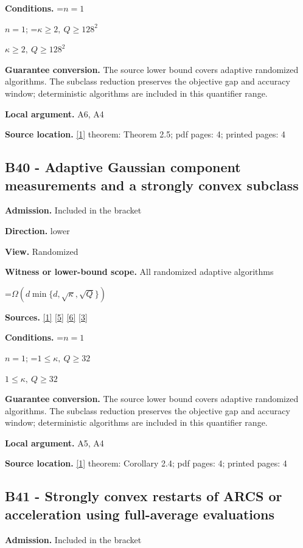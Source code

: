 \documentclass[10pt,a4paper]{article}
\newcommand{\AtlasMath}[1]{\par\begingroup\centering\setbox0=\hbox{$\displaystyle #1$}\ifdim\wd0>1.4\linewidth\typeout{ATLAS WIDE FORMULA: \the\wd0}\fi\ifdim\wd0>\linewidth\resizebox{\linewidth}{!}{\box0}\else\box0\fi\par\endgroup}
\newcommand{\AtlasInlineMath}[1]{\begingroup\setbox0=\hbox{$#1$}\ifdim\wd0>.4\linewidth\endgroup\AtlasMath{#1}\else\endgroup$#1$\fi}
\begin{document}
\textbf{Conditions.} \AtlasInlineMath{n=1}; \AtlasInlineMath{\kappa\ge2,\ Q\ge128^2}

\textbf{Guarantee conversion.} The source lower bound covers adaptive randomized algorithms. The subclass reduction preserves the objective gap and accuracy window; deterministic algorithms are included in this quantifier range.

\textbf{Local argument.} A6, A4

\textbf{Source location.} \href{https://arxiv.org/html/2610.00345v1}{[1]} theorem: Theorem 2.5; pdf pages: 4; printed pages: 4

\subsection{B40 - Adaptive Gaussian component measurements and a strongly convex subclass}
\textbf{Admission.} Included in the bracket

\textbf{Direction.} lower

\textbf{View.} Randomized

\textbf{Witness or lower-bound scope.} All randomized adaptive algorithms

\AtlasMath{\Omega(d\min\{d,\sqrt\kappa,\sqrt Q\})}
\textbf{Sources.} \href{https://arxiv.org/html/2610.00345v1}{[1]} \href{https://arxiv.org/html/2607.16558v2}{[5]} \href{https://www.mathnet.ru/php/archive.phtml?jrnid=mzm&option_lang=eng&paperid=1697&wshow=paper}{[6]} \href{https://arxiv.org/abs/2109.08858}{[3]}

\textbf{Conditions.} \AtlasInlineMath{n=1}; \AtlasInlineMath{1\le\kappa,\ Q\ge32}

\textbf{Guarantee conversion.} The source lower bound covers adaptive randomized algorithms. The subclass reduction preserves the objective gap and accuracy window; deterministic algorithms are included in this quantifier range.

\textbf{Local argument.} A5, A4

\textbf{Source location.} \href{https://arxiv.org/html/2610.00345v1}{[1]} theorem: Corollary 2.4; pdf pages: 4; printed pages: 4

\subsection{B41 - Strongly convex restarts of ARCS or acceleration using full-average evaluations}
\textbf{Admission.} Included in the bracket
\end{document}
